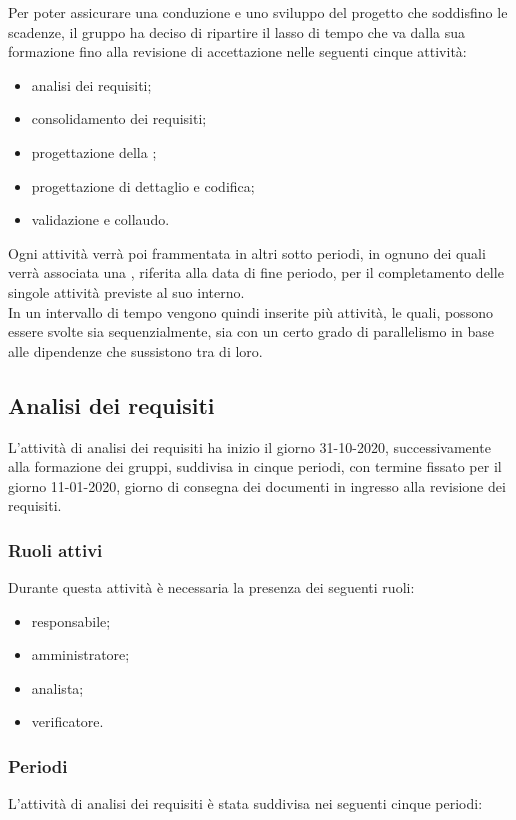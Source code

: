 Per poter assicurare una conduzione e uno sviluppo del progetto che soddisfino le scadenze, il gruppo ha deciso di ripartire il lasso di tempo che va dalla sua formazione fino alla revisione di accettazione nelle seguenti cinque attività:

\begin{itemize}
	\item analisi dei requisiti;
	\item consolidamento dei requisiti;
	\item progettazione della ;
	\item progettazione di dettaglio e codifica;
	\item validazione e collaudo.
\end{itemize}
Ogni attività verrà poi frammentata in altri sotto periodi, in ognuno dei quali verrà associata una ,
riferita alla data di fine periodo, per il completamento delle singole attività previste al suo interno.\\
In un intervallo di tempo vengono quindi inserite più attività, le quali, possono essere svolte sia sequenzialmente, sia con un certo grado di parallelismo in base alle dipendenze che sussistono tra di loro.

\subsection{Analisi dei requisiti}
L’attività di analisi dei requisiti ha inizio il giorno 31-10-2020, successivamente alla formazione dei gruppi, suddivisa in cinque periodi, con termine fissato per il giorno 11-01-2020, giorno di consegna dei documenti in ingresso alla revisione dei requisiti.

\subsubsection{Ruoli attivi}
Durante questa attività è necessaria la presenza dei seguenti ruoli:
\begin{itemize}
	\item responsabile;
	\item amministratore;
	\item analista;
	\item verificatore.
\end{itemize}

\subsubsection{Periodi}
L'attività di analisi dei requisiti è stata suddivisa nei seguenti cinque periodi:

